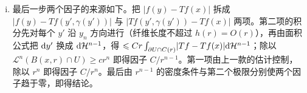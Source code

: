 \documentclass[../../main.tex]{subfiles}%
\begin{document}
\begin{remark}
\begin{enumerate}[(i)]
\begin{align*}
\int_{B(x,r)\cap U}\lvert f(y',\gamma(y'))-f(y)\rvert\diff y\leqslant(1+L)r\int_{C'(r)\cap U}\lvert Df\rvert\diff y\leqslant Cr\lVert Df\rVert(C(r)\cap U),
\end{align*}
其中 $C'(r):=\{y\mid\lvert y'-x'\rvert<r,\ \gamma(y')<y_n<\gamma(y')+(1+L)r\}\subseteq C(r)$。对一般的 $f\in\BV(U)$，把该估计用于\cref{theorem:ch05-5-3}的逼近序列并令 $k\to\infty$：左端由 $f_k\to f$ 于 $L^1(U)$ 与 $Tf_k\to Tf$ 于 $L^1(\partial U;\mathcal{H}^{n-1})$ 控制，右端在 $\lVert Df\rVert(\partial C(r)\cap U)=0$ 的 $r$ 上收敛；这样的 $r$ 除至多可数多个外全部适用，而在 $r\to0$ 的极限中只需一列趋于零的 $r$。%
\item 最后一步两个因子的来源如下。把 $\lvert f(y)-Tf(x)\rvert$ 拆成 $\lvert f(y)-Tf(y',\gamma(y'))\rvert$ 与 $\lvert Tf(y',\gamma(y'))-Tf(x)\rvert$ 两项。第二项的积分先对每个 $y'$ 沿 $y_n$ 方向进行（纤维长度不超过 $h(r)=O(r)$），再由面积公式把 $\mathrm{d} y'$ 换成 $\mathrm{d}\mathcal{H}^{n-1}$，得 $\leqslant Cr\int_{\partial U\cap C(r)}\lvert Tf-Tf(x)\rvert\mathrm{d}\mathcal{H}^{n-1}$；除以 $\mathcal{L}^n(B(x,r)\cap U)\geqslant cr^n$ 即得因子 $C/r^{n-1}$。第一项由上一款的估计控制，除以 $r^n$ 即得因子 $C/r^n$。最后由 $r^{n-1}$ 的密度条件与第二个极限分别使两个因子趋于零，即得结论。
\end{enumerate}
\end{remark}
\end{document}
